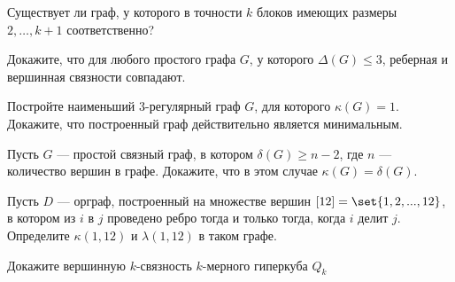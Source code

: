 \documentclass[a4paper,12pt,twoside]{article}
\begin{document}
\begin{?}
    Существует ли граф, у которого в точности \(k\) блоков имеющих размеры \(2, \ldots, k + 1\) соответственно?
\end{?}
\begin{?}
    Докажите, что для любого простого графа $G$, у которого $\Delta(G) \leqslant 3$, реберная и вершинная связности совпадают.
\end{?}
\begin{?}
    Постройте наименьший 3-регулярный граф $G$, для которого $\kappa(G) = 1$. Докажите, что построенный граф действительно является минимальным.
\end{?}
\begin{?}
    Пусть $G$ --- простой связный граф, в котором $\delta(G) \geq n - 2$, где $n$ --- количество вершин в графе. Докажите, что в этом случае $\kappa(G) = \delta(G)$.
\end{?}
\begin{?}
    Пусть $D$ --- орграф, построенный на множестве вершин $[12] = \set{1, 2, ..., 12}$, в котором из $i$ в $j$ проведено ребро тогда и только тогда, когда $i$ делит $j$. Определите $\kappa(1, 12)$ и $\lambda(1, 12)$ в таком графе.
\end{?}
\begin{?}
    Докажите вершинную $k$-связность $k$-мерного гиперкуба $Q_k$
\end{?}
\end{document}
